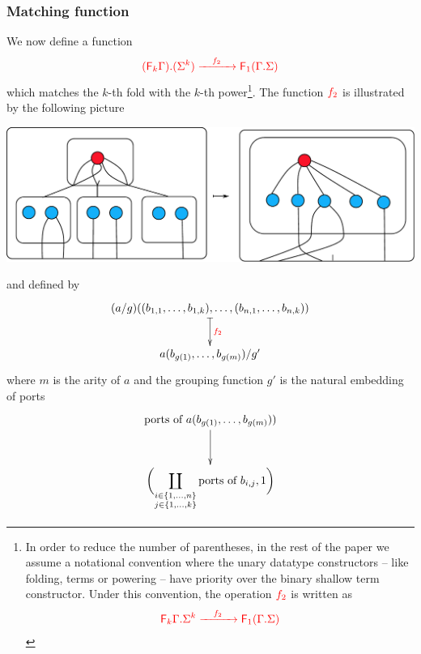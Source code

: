 \smallskip

\subsubsection{Matching function}
We now define a function 
\begin{align*}
{\color{red}{{\color{red}{({\color{red}{\mathsf F_{k}}}\Gamma) . (\Sigma^k)}} \xrightarrow{\quad f_2\quad} {\color{red}{\mathsf F_{1}}}({\color{red}{\Gamma . \Sigma}})}} 
\end{align*}
which matches the $k$-th fold with the $k$-th power\footnote{In order to reduce the number of parentheses, in  the rest of the paper we assume a notational convention where the unary datatype constructors -- like folding, terms or powering -- have priority over the binary shallow term constructor. Under this convention, the operation ${\color{red}{f_2}}$ is written as 
\begin{align*}
    {\color{red}{{\color{red}{{\color{red}{\mathsf F_{k}}}\Gamma . \Sigma^k}} \xrightarrow{\quad f_2\quad} {\color{red}{\mathsf F_{1}}}({\color{red}{\Gamma . \Sigma}})}} 
    \end{align*}}.
    The function ${\color{red}{f_2}}$ is illustrated by the following  picture
\begin{center}
\includegraphics[scale=.35]{pictures/shallow-unfold}
\end{center}
and  defined by
\begin{eqnarray*}
    \xymatrix{
        (a/g)((b_{1,1},\dots,b_{1,k}),\dots, (b_{n,1},\dots,b_{n,k})) 
        \ar@{|->}[d]^{\ranked{f_2}} \\
         a(b_{g(1)},\dots,b_{g(m)})/g'
    }
\end{eqnarray*}
where $m$ is the arity of $a$ and the grouping function  $g'$ is  the natural embedding of ports 
\begin{align*}
\xymatrix{
    \text{ports of $a(b_{g(1)},\dots,b_{g(m)}))$}
    \ar[d]
    \\
 \displaystyle{\biggl(\coprod_{\substack{i \in \set{1,\ldots,n}\\ j \in \set{1,\ldots,k}}} \text{ports of $b_{i,j}$}, 1 \biggr)} 
}
\end{align*}
\smallskip


